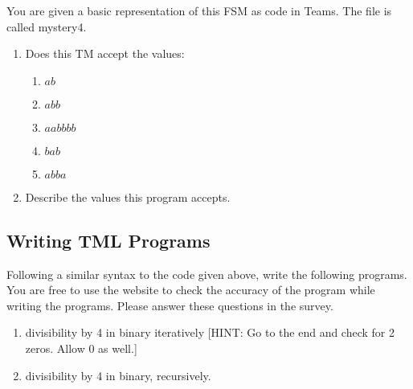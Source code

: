\begin{appendices}
\begin{enumerate}
\begin{figure}[H]
    \end{figure}
    You are given a basic representation of this FSM as code in Teams. The file is called mystery4.
    \begin{enumerate}
        \item Does this TM accept the values:
        \begin{enumerate}
            \item $ab$
            \item $abb$
            \item $aabbbb$            
            \item $bab$
            \item $abba$
        \end{enumerate}

        \item Describe the values this program accepts.
    \end{enumerate}
\end{enumerate}
\newpage

\subsection{Writing TML Programs}

Following a similar syntax to the code given above, write the following programs. You are free to use the website to check the accuracy of the program while writing the programs. Please answer these questions in the survey.
\begin{enumerate}
    \item divisibility by 4 in binary iteratively [HINT: Go to the end and check for 2 zeros. Allow 0 as well.]
    \item divisibility by 4 in binary, recursively.
\end{enumerate}
    

\end{appendices}
